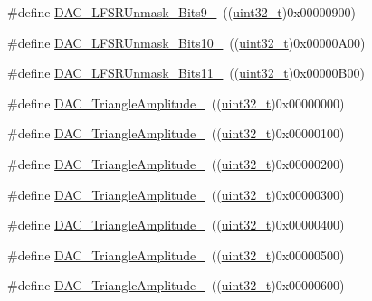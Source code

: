 \begin{DoxyCompactItemize}
\#define \hyperlink{group___d_a_c__lfsrunmask__triangleamplitude_gaf7f4540d9ec6efe074e1e4485f9a347a}{D\+A\+C\+\_\+\+L\+F\+S\+R\+Unmask\+\_\+\+Bits9\+\_}~((\hyperlink{_p_e___types_8h_a33594304e786b158f3fb30289278f5af}{uint32\+\_\+t})0x00000900)
\item 
\#define \hyperlink{group___d_a_c__lfsrunmask__triangleamplitude_ga7670f0e10f062571d0e56027ef653228}{D\+A\+C\+\_\+\+L\+F\+S\+R\+Unmask\+\_\+\+Bits10\+\_}~((\hyperlink{_p_e___types_8h_a33594304e786b158f3fb30289278f5af}{uint32\+\_\+t})0x00000\+A00)
\item 
\#define \hyperlink{group___d_a_c__lfsrunmask__triangleamplitude_gaeb9b5992b771f9a14587eeda58227831}{D\+A\+C\+\_\+\+L\+F\+S\+R\+Unmask\+\_\+\+Bits11\+\_}~((\hyperlink{_p_e___types_8h_a33594304e786b158f3fb30289278f5af}{uint32\+\_\+t})0x00000\+B00)
\item 
\#define \hyperlink{group___d_a_c__lfsrunmask__triangleamplitude_ga49b1eddf4e6371b4be8751162dc94ac4}{D\+A\+C\+\_\+\+Triangle\+Amplitude\+\_}~((\hyperlink{_p_e___types_8h_a33594304e786b158f3fb30289278f5af}{uint32\+\_\+t})0x00000000)
\item 
\#define \hyperlink{group___d_a_c__lfsrunmask__triangleamplitude_ga9798d68c3bbf0a57306bf2f962697377}{D\+A\+C\+\_\+\+Triangle\+Amplitude\+\_}~((\hyperlink{_p_e___types_8h_a33594304e786b158f3fb30289278f5af}{uint32\+\_\+t})0x00000100)
\item 
\#define \hyperlink{group___d_a_c__lfsrunmask__triangleamplitude_gad3f31de1277836df1109576a53c47e87}{D\+A\+C\+\_\+\+Triangle\+Amplitude\+\_}~((\hyperlink{_p_e___types_8h_a33594304e786b158f3fb30289278f5af}{uint32\+\_\+t})0x00000200)
\item 
\#define \hyperlink{group___d_a_c__lfsrunmask__triangleamplitude_ga42653712ce783d33ecb2f3e97e9c2ece}{D\+A\+C\+\_\+\+Triangle\+Amplitude\+\_}~((\hyperlink{_p_e___types_8h_a33594304e786b158f3fb30289278f5af}{uint32\+\_\+t})0x00000300)
\item 
\#define \hyperlink{group___d_a_c__lfsrunmask__triangleamplitude_ga10b15745b749c62a56bd3d7bd5a27e1b}{D\+A\+C\+\_\+\+Triangle\+Amplitude\+\_}~((\hyperlink{_p_e___types_8h_a33594304e786b158f3fb30289278f5af}{uint32\+\_\+t})0x00000400)
\item 
\#define \hyperlink{group___d_a_c__lfsrunmask__triangleamplitude_gaaae92dae9c4da55e29c645396825e36b}{D\+A\+C\+\_\+\+Triangle\+Amplitude\+\_}~((\hyperlink{_p_e___types_8h_a33594304e786b158f3fb30289278f5af}{uint32\+\_\+t})0x00000500)
\item 
\#define \hyperlink{group___d_a_c__lfsrunmask__triangleamplitude_gaacec0af3f69db46f8984be3af9ecadfb}{D\+A\+C\+\_\+\+Triangle\+Amplitude\+\_}~((\hyperlink{_p_e___types_8h_a33594304e786b158f3fb30289278f5af}{uint32\+\_\+t})0x00000600)

\end{DoxyCompactItemize}
